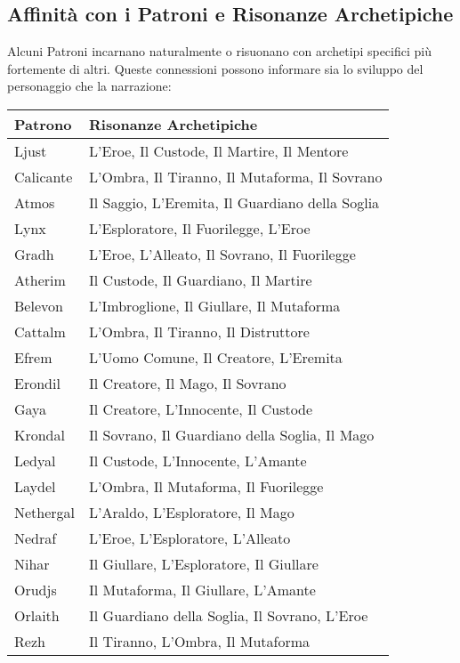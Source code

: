 \begin{multicols}{2}
\subsection*{Affinità con i Patroni e Risonanze Archetipiche}

Alcuni Patroni incarnano naturalmente o risuonano con archetipi specifici più fortemente di altri. Queste connessioni possono informare sia lo sviluppo del personaggio che la narrazione:

\noindent\begin{tabularx}{\columnwidth}{lX}
\toprule
\textbf{Patrono} & \textbf{Risonanze Archetipiche} \\
\midrule
Ljust & L'Eroe, Il Custode, Il Martire, Il Mentore \\
\hline
Calicante & L'Ombra, Il Tiranno, Il Mutaforma, Il Sovrano \\
\hline
Atmos & Il Saggio, L'Eremita, Il Guardiano della Soglia \\
\hline
Lynx & L'Esploratore, Il Fuorilegge, L'Eroe \\
\hline
Gradh & L'Eroe, L'Alleato, Il Sovrano, Il Fuorilegge \\
\hline
Atherim & Il Custode, Il Guardiano, Il Martire \\
\hline
Belevon & L'Imbroglione, Il Giullare, Il Mutaforma \\
\hline
Cattalm & L'Ombra, Il Tiranno, Il Distruttore \\
\hline
Efrem & L'Uomo Comune, Il Creatore, L'Eremita \\
\hline
Erondil & Il Creatore, Il Mago, Il Sovrano \\
\hline
Gaya & Il Creatore, L'Innocente, Il Custode \\
\hline
Krondal & Il Sovrano, Il Guardiano della Soglia, Il Mago \\
\hline
Ledyal & Il Custode, L'Innocente, L'Amante \\
\hline
Laydel & L'Ombra, Il Mutaforma, Il Fuorilegge \\
\hline
Nethergal & L'Araldo, L'Esploratore, Il Mago \\
\hline
Nedraf & L'Eroe, L'Esploratore, L'Alleato \\
\hline
Nihar & Il Giullare, L'Esploratore, Il Giullare \\
\hline
Orudjs & Il Mutaforma, Il Giullare, L'Amante \\
\hline
Orlaith & Il Guardiano della Soglia, Il Sovrano, L'Eroe \\
\hline
Rezh & Il Tiranno, L'Ombra, Il Mutaforma \\

\end{tabularx}
\end{multicols}
